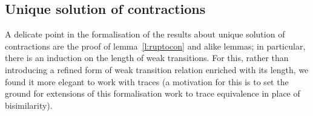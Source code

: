 
\subsection{Unique solution of contractions}

A delicate point in the formalisation of the results about unique solution of
contractions are the proof of lemma~\ref{l:ruptocon} and alike lemmas;
in particular, there is
 an induction on the length of weak transitions. 
For this, rather than 
 introducing a refined form of weak transition relation
enriched with its length, 
we found it more elegant  to  work with traces
(a motivation for this is to set the ground for extensions of this
formalisation work to trace equivalence in place of bisimilarity).



